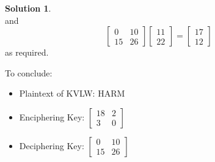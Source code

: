 \documentclass[11pt]{article}
\theoremstyle{definition}\newtheorem{definition}{Definition}
\theoremstyle{definition}\newtheorem{question}{Question}
\theoremstyle{definition}\newtheorem*{solution}{Solution}
\theoremstyle{definition}\newtheorem{example}{Example}
\theoremstyle{definition}\newtheorem{notation}{Notation}
\theoremstyle{theorem}\newtheorem{theorem}{Theorem}
\theoremstyle{theorem}\newtheorem{corollary}{Corollary}
\theoremstyle{theorem}\newtheorem{lemma}{Lemma}
\theoremstyle{theorem}\newtheorem{proposition}{Proposition}
\begin{document}
\begin{solution}
\begin{equation*}
    \end{equation*}
    and
    \begin{equation*}
        \begin{bmatrix} 0 & 10 \\ 15 & 26 \end{bmatrix} \begin{bmatrix} 11 \\ 22 \end{bmatrix} = \begin{bmatrix} 17 \\ 12 \end{bmatrix}
    \end{equation*}
    as required.

    To conclude:
    \begin{itemize}
        \item Plaintext of KVLW: HARM
        \item Enciphering Key: $\begin{bmatrix} 18 & 2 \\ 3 & 0 \end{bmatrix}$
        \item Deciphering Key: $\begin{bmatrix} 0 & 10 \\ 15 & 26 \end{bmatrix}$
    \end{itemize}
\end{solution}
\end{document}
